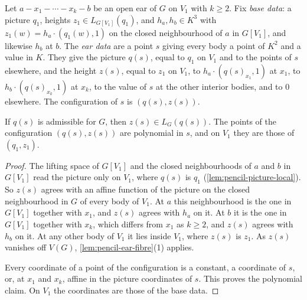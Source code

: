 \begin{definition}
  \label{def:pencil-ear-data}
  \leanok
  Let $a - x_1 - \cdots - x_k - b$ be an open ear of $G$ on $V_1$ with $k \ge 2$. Fix \emph{base
  data}: a picture $q_1$, heights $z_1 \in L_{G[V_1]}(q_1)$, and $h_a, h_b \in K^3$ with
  $z_1(w) = h_a \cdot (q_1(w), 1)$ on the closed neighbourhood of $a$ in $G[V_1]$, and likewise $h_b$
  at $b$. The \emph{ear data} are a point $s$ giving every body a point of $K^2$ and a value in $K$.
  They give the picture $q(s)$, equal to $q_1$ on $V_1$ and to the points of $s$ elsewhere, and
  the height $z(s)$, equal to $z_1$ on $V_1$, to $h_a \cdot (q(s)_{x_1}, 1)$ at $x_1$, to
  $h_b \cdot (q(s)_{x_k}, 1)$ at $x_k$, to the value of $s$ at the other interior bodies, and to
  $0$ elsewhere. The configuration of $s$ is $(q(s), z(s))$.
\end{definition}

\begin{lemma}
  \label{lem:pencil-ear-data}
  \leanok
  If $q(s)$ is admissible for $G$, then $z(s) \in L_G(q(s))$. The points of the configuration
  $(q(s), z(s))$ are polynomial in $s$, and on $V_1$ they are those of $(q_1, z_1)$.
\end{lemma}
\begin{proof}
  \leanok
  The lifting space of $G[V_1]$ and the closed neighbourhoods of $a$ and $b$ in $G[V_1]$ read
  the picture only on $V_1$, where $q(s)$ is $q_1$ (\cref{lem:pencil-picture-local}). So $z(s)$
  agrees with an affine function of the picture on the closed neighbourhood in $G$ of every body
  of $V_1$. At $a$ this neighbourhood is the one in $G[V_1]$ together with $x_1$, and $z(s)$
  agrees with $h_a$ on it. At $b$ it is the one in $G[V_1]$ together with $x_k$, which differs
  from $x_1$ as $k \ge 2$, and $z(s)$ agrees with $h_b$ on it. At any other body of $V_1$ it lies
  inside $V_1$, where $z(s)$ is $z_1$. As $z(s)$ vanishes off $V(G)$,
  \cref{lem:pencil-ear-fibre}(1) applies.

  Every coordinate of a point of the configuration is a constant, a coordinate of $s$, or, at
  $x_1$ and $x_k$, affine in the picture coordinates of $s$. This proves the polynomial claim. On
  $V_1$ the coordinates are those of the base data.
\end{proof}

